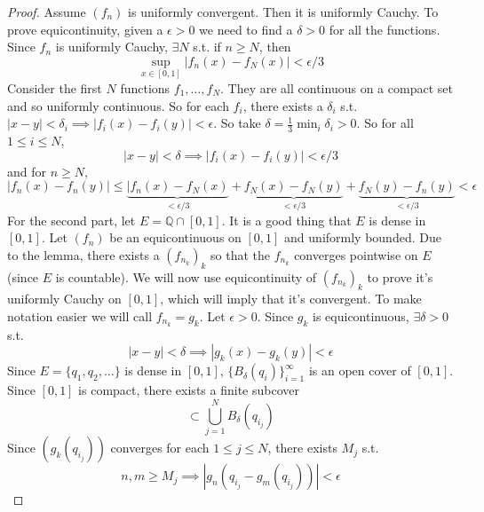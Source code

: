   \begin{proof}
    Assume $(f_n)$ is uniformly convergent. Then it is uniformly Cauchy. To prove equicontinuity, given a $\epsilon > 0$ we need to find a $\delta > 0$ for all the functions. Since $f_n$ is uniformly Cauchy, $\exists N$ s.t. if $n \geq N$, then 
    \begin{equation}
      \sup_{x \in [0, 1]} | f_n (x) - f_N (x) | < \epsilon/3
    \end{equation} 
    Consider the first $N$ functions $f_1, \ldots, f_N$. They are all continuous on a compact set and so uniformly continuous. So for each $f_i$, there exists a $\delta_i$ s.t. $|x - y| < \delta_i \implies |f_i (x) - f_i (y)| < \epsilon$. So take $\delta = \frac{1}{3} \min_i \delta_i > 0$. So for all $1 \leq i \leq N$, 
    \begin{equation}
      |x - y| < \delta \implies |f_i (x) - f_i (y)| < \epsilon/3
    \end{equation} 
    and for $n \geq N$, 
    \begin{equation}
      |f_n (x) - f_n (y)| \leq \underbrace{|f_n (x) - f_N (x)}_{< \epsilon/3} + \underbrace{f_N (x) - f_N (y)}_{< \epsilon/3} + \underbrace{f_N (y) - f_n (y)}_{< \epsilon/3} < \epsilon
    \end{equation} 
    For the second part, let $E = \mathbb{Q} \cap [0, 1]$. It is a good thing that $E$ is dense in $[0, 1]$. Let $(f_n)$ be an equicontinuous on $[0, 1]$ and uniformly bounded. Due to the lemma, there exists a $(f_{n_k})_k$ so that the $f_{n_k}$ converges pointwise on $E$ (since $E$ is countable). We will now use equicontinuity of $(f_{n_k})_k$ to prove it's uniformly Cauchy on $[0, 1]$, which will imply that it's convergent. To make notation easier we will call $f_{n_k} = g_k$. Let $\epsilon > 0$. Since $g_k$ is equicontinuous, $\exists \delta > 0$ s.t. 
    \begin{equation}
      |x - y| < \delta \implies |g_k (x) - g_k (y)| < \epsilon
    \end{equation} 
    Since $E = \{q_1, q_2, \ldots \}$ is dense in $[0, 1]$, $\{B_\delta (q_i) \}_{i=1}^\infty$ is an open cover of $[0, 1]$. Since $[0, 1]$ is compact, there exists a finite subcover 
    \begin{equation}
      [0, 1] \subset \bigcup_{j=1}^N B_{\delta} (q_{i_j})
    \end{equation}
    Since $(g_k (q_{i_j}))$ converges for each $1 \leq j \leq N$, there exists $M_j$ s.t. 
    \begin{equation}
      n, m \geq M_j \implies |g_n (q_{i_j} - g_m (q_{i_j}))| < \epsilon

\end{equation}
\end{proof}
